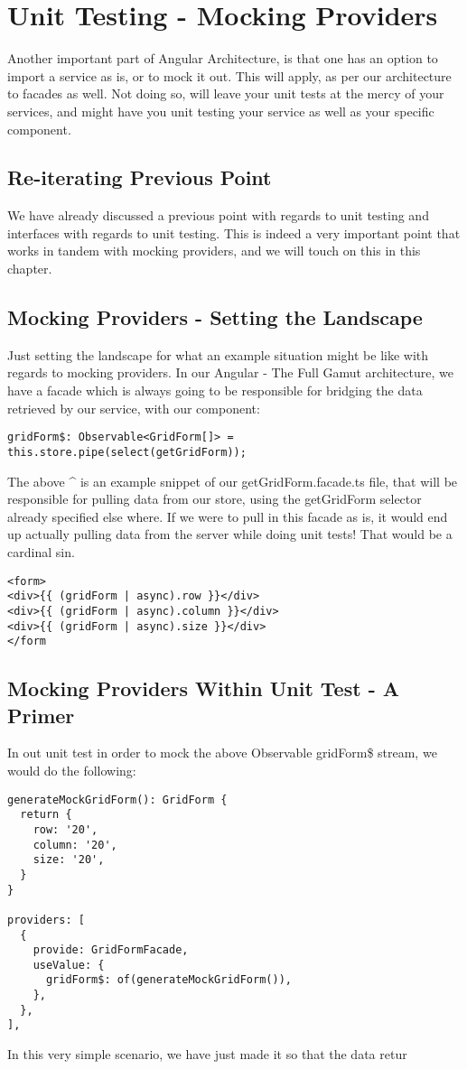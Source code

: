 \maketitle{}
\section{ Unit Testing - Mocking Providers }
Another important part of Angular Architecture, is that one has an option to
import a service as is, or to mock it out. This will apply, as per our
architecture to facades as well. Not doing so, will leave your unit tests at
the mercy of your services, and might have you unit testing your service as
well as your specific component.

\subsection{ Re-iterating Previous Point }
We have already discussed a previous point with regards to unit testing and
interfaces with regards to unit testing. This is indeed a very important point
that works in tandem with mocking providers, and we will touch on this in this
chapter.

\subsection{ Mocking Providers - Setting the Landscape }
Just setting the landscape for what an example situation might be like with
regards to mocking providers. In our Angular - The Full Gamut architecture, we
have a facade which is always going to be responsible for bridging the data
retrieved by our service, with our component:
\begin{lstlisting}
gridForm$: Observable<GridForm[]> = this.store.pipe(select(getGridForm));
\end{lstlisting}

The above ^ is an example snippet of our getGridForm.facade.ts file, that will
be responsible for pulling data from our store, using the getGridForm selector
already specified else where. If we were to pull in this facade as is, it would
end up actually pulling data from the server while doing unit tests! That would
be a cardinal sin.
\begin{verbatim}
<form>
<div>{{ (gridForm | async).row }}</div>
<div>{{ (gridForm | async).column }}</div>
<div>{{ (gridForm | async).size }}</div>
</form
\end{verbatim}

\subsection{ Mocking Providers Within Unit Test - A Primer }
In out unit test in order to mock the above Observable gridForm\$ stream, we
would do the following:
\begin{lstlisting}
generateMockGridForm(): GridForm {
  return {
    row: '20',
    column: '20',
    size: '20',
  }
}

providers: [
  {
    provide: GridFormFacade,
    useValue: {
      gridForm$: of(generateMockGridForm()),
    },
  },
],
\end{lstlisting}

In this very simple scenario, we have just made it so that the data retur
